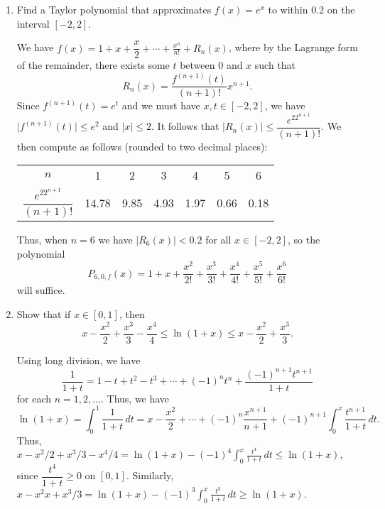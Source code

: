 \documentclass[letterpaper,12pt]{article}
\newcommand{\N}{\mathbb{N}}
\newcommand{\abs}[1]{\lvert #1\rvert}
\begin{document}
\begin{enumerate}
\begin{enumerate}
 {\em Note}: if you're worried about the fact that $\cos x=0$ for $x = \pi/2 + n\pi$, for all $n\in\N$, you can check that the limit of $f'(x)/g'(x)$ at each such point is zero, so one can redefine $f'/g'$ to be equal to zero at each such point. (This falls under the general adage that removable discontinuities don't affect a limit.)
 
 \bigskip
\end{enumerate}
 \item Find a Taylor polynomial that approximates $f(x)=e^x$ to within 0.2 on the interval $[-2,2]$.
 
 \bigskip
 
 We have $f(x) = 1+x+\dfrac{x}{2}+\cdots + \frac{x^n}{n!}+R_n(x)$, where by the Lagrange form of the remainder, there exists some $t$ between 0 and $x$ such that
 \[
 R_n(x) = \frac{f^{(n+1)}(t)}{(n+1)!}x^{n+1}.
 \]
 Since $f^{(n+1)}(t) = e^t$ and we must have $x,t\in [-2,2]$, we have $\abs{f^{(n+1)}(t)}\leq e^2$ and $\abs{x}\leq 2$. It follows that $\abs{R_n(x)}\leq \dfrac{e^22^{n+1}}{(n+1)!}$. We then compute as follows (rounded to two decimal places):
 \begin{center}
 \begin{tabular}{|c|cccccc|}
 \hline
 $n$ & 1 & 2 & 3 & 4 & 5 & 6\\
 $\dfrac{e^22^{n+1}}{(n+1)!}$ & 14.78 & 9.85 & 4.93 & 1.97 & 0.66 & 0.18\\
 \hline
 \end{tabular}
 \end{center}
 Thus, when $n=6$ we have $\abs{R_6(x)}<0.2$ for all $x\in[-2,2]$, so the polynomial
 \[
 P_{6,0,f}(x) = 1+x+\frac{x^2}{2!}+\frac{x^3}{3!}+\frac{x^4}{4!}+\frac{x^5}{5!}+\frac{x^6}{6!}
 \]
 will suffice.
 
 \bigskip
 
 \item Show that if $x\in [0,1]$, then
\[
 x-\frac{x^2}{2}+\frac{x^3}{3}-\frac{x^4}{4}\leq \ln(1+x) \leq x-\frac{x^2}{2}+\frac{x^3}{3}.
\]

\bigskip

Using long division, we have
\[
\frac{1}{1+t} = 1-t+t^2-t^3+\cdots+(-1)^nt^n + \frac{(-1)^{n+1}t^{n+1}}{1+t}
\]
for each $n=1,2,\ldots$. Thus, we have
\[
\ln(1+x) =\int_0^1 \frac{1}{1+t}\,dt = x - \frac{x^2}{2} + \cdots + (-1)^n\frac{x^{n+1}}{n+1} + (-1)^{n+1}\int_0^x\frac{t^{n+1}}{1+t}\,dt.
\]
Thus, $\displaystyle x-x^2/2+x^3/3-x^4/4 = \ln(1+x) -(-1)^4\int_0^x\frac{t^{4}}{1+t}\,dt\leq \ln(1+x)$, since $\dfrac{t^{4}}{1+t}\geq 0$ on $[0,1]$. Similarly, $\displaystyle x-x^2x+x^3/3 = \ln(1+x)-(-1)^3\int_0^x\frac{t^3}{1+t}\,dt\geq \ln(1+x)$.





\end{enumerate}
\end{document}
